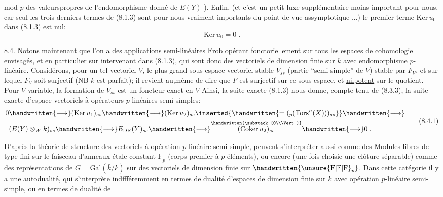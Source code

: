 mod $p$ des valeurspropres de l'endomorphisme donné de $E(Y)$ ). Enfin, (et c'est un petit luxe supplémentaire moins important pour nous, car seul les trois derniers termes de (8.1.3) sont pour nous vraiment importants du point de vue assymptotique ...)  le premier terme $\mathrm{Ker}\,u_0$ dans (8.1.3) est nul:
\[
\mathrm{Ker}\,u_0=0\;.
\tag*{(8.3.3)}
\]

8.4. Notons maintenant que l'on a des applications semi-linéaires $\mathrm{Frob}$ opérant fonctoriellement sur tous les espaces de cohomologie envisagés, et en particulier sur   intervenant dans (8.1.3), qui sont donc des vectoriels de dimension finie sur $k$ avec endomorphisme $p$-linéaire. Considérons, pour un tel vectoriel $V$, le plus grand sous-espace vectoriel stable $V_{ss}$ (partie ``semi-simple'' de $V$) stable par $F_V$, et sur lequel $F_V$ soit  surjectif (NB $k$ est parfait);  il revient au,même de dire que $F$ est surjectif sur ce sous-espace, et \uline{nilpotent} sur le quotient. Pour $V$ variable, la formation de $V_{ss}$ est un foncteur exact en $V$ Ainsi, la suite exacte (8.1.3) nous donne, compte tenu de (8.3.3), la suite exacte d'espace vectoriels à opérateurs $p$-linéaires semi-simples:
\[
\begin{aligned}
0&\handwritten{\longrightarrow}(\mathrm{Ker}\,u_1)_{ss}\handwritten{\longrightarrow}(\mathrm{Ker}\,u_2)_{ss}
\inserted{\handwritten{=({}_p(\mathrm{Tors}^n(X)))_{ss}}}\handwritten{\longrightarrow}\\
& (E(Y)\otimes_W k)_{ss}\handwritten{\longrightarrow}E_{\rm DR}(Y)_{ss}\handwritten{\longrightarrow}
\overset{\handwritten{\substack{0\\\Vert}}}{(\mathrm{Coker}\,u_2)_{ss}}\handwritten{\longrightarrow}0\;.
\end{aligned}
\tag*{(8.4.1)}
\]

 D'après la théorie de structure des vectoriels à opération $p$-linéaire semi-simple,   peuvent s'interpréter aussi comme des Modules libres de type fini sur le faisceau d'anneaux étale constant $\underline{\mathrm F}_p$ (corps premier à $p$ éléments), ou encore  (une fois choisie une clôture séparable) comme des  représentations de $G=\mathrm{Gal}(\bar k/k)$ sur des vectoriels de dimension finie sur $\handwritten{\unsure{\mathrm F|\mathbb F|\underline{\mathrm F}}_p}$. Dans cette catégorie il y a une autodualité, qui s'interprète indffféremment en termes de dualité d'espaces de dimension finie sur $k$ avec opération $p$-linéaire semi-simple, ou en termes de dualité de
